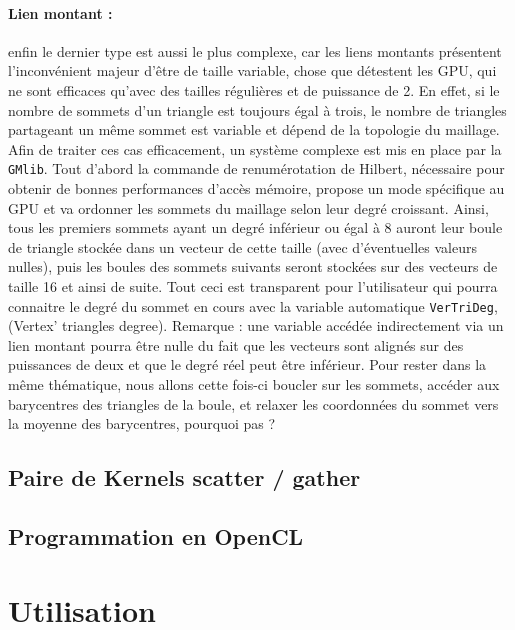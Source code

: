 \documentclass[a4paper,12pt]{article}
\begin{document}
\paragraph{Lien montant :} enfin le dernier type est aussi le plus complexe, car les liens montants présentent l'inconvénient majeur d'être de taille variable, chose que détestent les GPU, qui ne sont efficaces qu'avec des tailles régulières et de puissance de 2. En effet, si le nombre de sommets d'un triangle est toujours égal à trois, le nombre de triangles partageant un même sommet est variable et dépend de la topologie du maillage. Afin de traiter ces cas efficacement, un système complexe est mis en place par la {\tt GMlib}. Tout d'abord la commande de renumérotation de Hilbert, nécessaire pour obtenir de bonnes performances d'accès mémoire, propose un mode spécifique au GPU et va ordonner les sommets du maillage selon leur degré croissant. Ainsi, tous les premiers sommets ayant un degré inférieur ou égal à 8 auront leur boule de triangle stockée dans un vecteur de cette taille (avec d'éventuelles valeurs nulles), puis les boules des sommets suivants seront stockées sur des vecteurs de taille 16 et ainsi de suite. Tout ceci est transparent pour l'utilisateur qui pourra connaitre le degré du sommet en cours avec la variable automatique {\tt VerTriDeg}, (Vertex' triangles degree).
Remarque : une variable accédée indirectement via un lien montant pourra être nulle du fait que les vecteurs sont alignés sur des puissances de deux et que le degré réel peut être inférieur.
Pour rester dans la même thématique, nous allons cette fois-ci boucler sur les sommets, accéder aux barycentres des triangles de la boule, et relaxer les coordonnées du sommet vers la moyenne des barycentres, pourquoi pas ?



\subsection{Paire de Kernels scatter / gather}

\subsection{Programmation en OpenCL}


%
%

\section{Utilisation}
\end{document}

